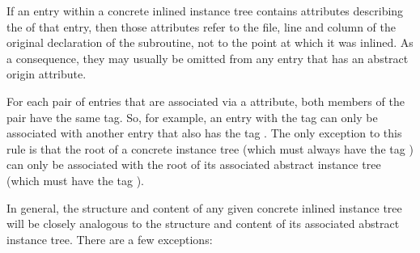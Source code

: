 If an entry within a concrete inlined instance tree contains
attributes describing the
of that entry, then those attributes refer to the file, line
and column of the original declaration of the subroutine,
not to the point at which it was inlined. As a consequence,
they may usually be omitted from any entry that has an abstract
origin attribute.

For each pair of entries that are associated via a
\DWATabstractorigin{} attribute, both members of the pair
have the same tag. So, for example, an entry with the tag
\DWTAGvariable{} can only be associated with another entry
that also has the tag \DWTAGvariable. The only exception
to this rule is that the root of a concrete instance tree
(which must always have the tag \DWTAGinlinedsubroutine)
can only be associated with the root of its associated abstract
instance tree (which must have the tag \DWTAGsubprogram).

In general, the structure and content of any given concrete
inlined instance tree will be closely analogous to the
structure and content of its associated abstract instance
tree. There are a few exceptions:

